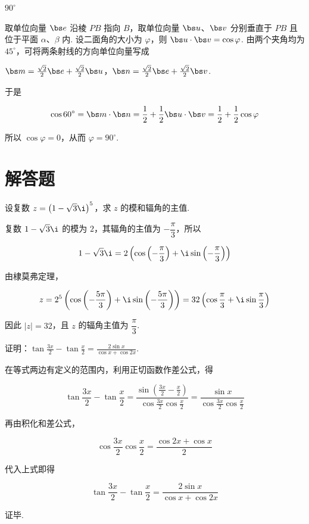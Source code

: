 \begin{answer}
\(90^\circ\)
\end{answer}

\begin{solution}
取单位向量 \(\bs e\) 沿棱 \(PB\) 指向 \(B\)，取单位向量 \(\bs u\)、\(\bs v\) 分别垂直于 \(PB\) 且位于平面 \(\alpha\)、\(\beta\) 内. 设二面角的大小为 \(\varphi\)，则 \(\bs u\cdot\bs v=\cos\varphi\). 由两个夹角均为 \(45^\circ\)，可将两条射线的方向单位向量写成

\(\bs m=\frac{\sqrt2}{2}\bs e+\frac{\sqrt2}{2}\bs u\)，\(\bs n=\frac{\sqrt2}{2}\bs e+\frac{\sqrt2}{2}\bs v\).

于是

\[\cos60^\circ=\bs m\cdot\bs n=\frac12+\frac12\bs u\cdot\bs v=\frac12+\frac12\cos\varphi\]

所以 \(\cos\varphi=0\)，从而 \(\varphi=90^\circ\).
\end{solution}

\section{解答题}

\begin{problem}
设复数 \(z = \left(1 - \sqrt{3}\i\right)^5\)，求 \(z\) 的模和辐角的主值.
\end{problem}

\begin{solution}
复数 \(1-\sqrt3\i\) 的模为 \(2\)，其辐角的主值为 \(-\dfrac\pi3\)，所以

\[1-\sqrt3\i=2\left(\cos\left(-\frac\pi3\right)+\i\sin\left(-\frac\pi3\right)\right)\]

由棣莫弗定理，

\[z=2^5\left(\cos\left(-\frac{5\pi}{3}\right)+\i\sin\left(-\frac{5\pi}{3}\right)\right)=32\left(\cos\frac\pi3+\i\sin\frac\pi3\right)\]

因此 \(\lvert z\rvert=32\)，且 \(z\) 的辐角主值为 \(\dfrac\pi3\).
\end{solution}

\begin{problem}
证明：\(\tan \frac{3x}{2} - \tan \frac{x}{2} = \frac{2\sin x}{\cos x + \cos 2x}\).
\end{problem}

\begin{solution}
在等式两边有定义的范围内，利用正切函数作差公式，得

\[\tan\frac{3x}{2}-\tan\frac{x}{2}=\frac{\sin\left(\frac{3x}{2}-\frac{x}{2}\right)}{\cos\frac{3x}{2}\cos\frac{x}{2}}=\frac{\sin x}{\cos\frac{3x}{2}\cos\frac{x}{2}}\]

再由积化和差公式，

\[\cos\frac{3x}{2}\cos\frac{x}{2}=\frac{\cos2x+\cos x}{2}\]

代入上式即得

\[\tan\frac{3x}{2}-\tan\frac{x}{2}=\frac{2\sin x}{\cos x+\cos2x}\]

证毕.
\end{solution}

